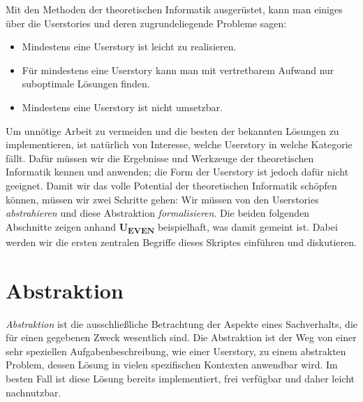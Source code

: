 Mit den Methoden der theoretischen Informatik ausgerüstet,
kann man einiges über die Userstories und deren zugrundeliegende Probleme sagen:
\begin{itemize}
    \item Mindestens eine Userstory ist leicht zu realisieren.
    \item Für mindestens eine Userstory kann man mit vertretbarem Aufwand nur suboptimale Lösungen finden.
    \item Mindestens eine Userstory ist nicht umsetzbar.
\end{itemize}
Um unnötige Arbeit zu vermeiden
und die besten der bekannten Lösungen zu implementieren,
ist natürlich von Interesse,
welche Userstory in welche Kategorie fällt.
Dafür müssen wir die Ergebnisse und Werkzeuge
der theoretischen Informatik kennen und anwenden;
die Form der Userstory ist jedoch dafür nicht geeignet.
Damit wir das volle Potential der theoretischen Informatik schöpfen können,
müssen wir zwei Schritte gehen:
Wir müssen von den Userstories \emph{abstrahieren}
und diese Abstraktion \emph{formalisieren}.
Die beiden folgenden Abschnitte zeigen anhand \textbf{U\textsubscript{EVEN}}
beispielhaft, was damit gemeint ist.
Dabei werden wir die ersten zentralen Begriffe dieses Skriptes einführen und diskutieren.
\section{Abstraktion}

\emph{Abstraktion} ist die ausschließliche Betrachtung der Aspekte eines Sachverhalts,
die für einen gegebenen Zweck wesentlich sind.
Die Abstraktion ist der Weg von einer sehr speziellen Aufgabenbeschreibung,
wie einer Userstory, zu einem abstrakten Problem,
dessen Lösung in vielen spezifischen Kontexten anwendbar wird.
Im besten Fall ist diese Lösung bereits implementiert, frei verfügbar
und daher leicht nachnutzbar.

